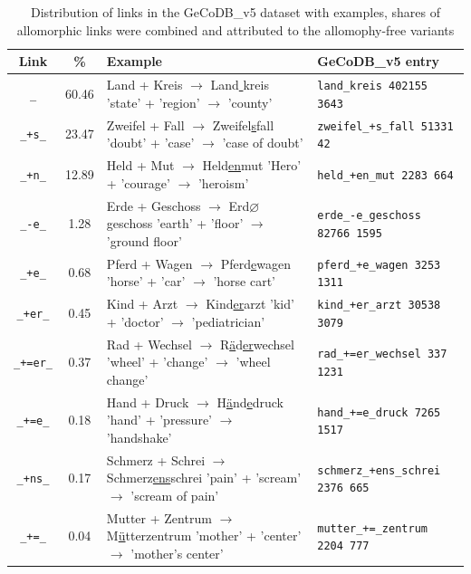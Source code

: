 \documentclass[11pt]{article}
\begin{document}
\begin{table}[h]
\centering
\begin{tabular}{|c|c|l|l|}
\hline
\textbf{Link} & \textbf{\%} & \textbf{Example} & \textbf{GeCoDB\_v5 entry} \\ \hline
\texttt{\_} & 60.46 & \makecell{Land + Kreis $\rightarrow$ Land\underline{ }kreis \\ 'state' + 'region' $\rightarrow$ 'county'} & \texttt{land\_kreis	402155	3643} \\ \hline
\texttt{\_+s\_} & 23.47 & \makecell{Zweifel + Fall $\rightarrow$ Zweifel\underline{s}fall \\ 'doubt' + 'case' $\rightarrow$ 'case of doubt'} & \texttt{zweifel\_+s\_fall	51331	42} \\ \hline
\texttt{\_+n\_} & 12.89 & \makecell{Held + Mut $\rightarrow$ Held\underline{en}mut \\ 'Hero' + 'courage' $\rightarrow$ 'heroism'} & \texttt{held\_+en\_mut	2283	664} \\ \hline
\texttt{\_-e\_} & 1.28 & \makecell{Erde + Geschoss $\rightarrow$ Erd\underline{$\varnothing$}geschoss \\ 'earth' + 'floor' $\rightarrow$ {'ground floor'}} & \texttt{erde\_-e\_geschoss	82766	1595} \\ \hline
\texttt{\_+e\_} & 0.68 & \makecell{Pferd + Wagen $\rightarrow$ Pferd\underline{e}wagen \\ 'horse' + 'car' $\rightarrow$ 'horse cart'} & \texttt{pferd\_+e\_wagen	3253	1311} \\ \hline
\texttt{\_+er\_} & 0.45 & \makecell{Kind + Arzt $\rightarrow$ Kind\underline{er}arzt \\ 'kid' + 'doctor' $\rightarrow$ 'pediatrician'} & \texttt {kind\_+er\_arzt	30538	3079} \\ \hline
\texttt{\_+=er\_} & 0.37 & \makecell{Rad + Wechsel $\rightarrow$ R\underline{{\"a}}d\underline{er}wechsel \\ 'wheel' + 'change' $\rightarrow$ 'wheel change'} & \texttt {rad\_+=er\_wechsel	337	1231} \\ \hline
\texttt{\_+=e\_} & 0.18 & \makecell{Hand + Druck $\rightarrow$ H\underline{{\"a}}nd\underline{e}druck \\ 'hand' + 'pressure' $\rightarrow$ 'handshake'} & \texttt {hand\_+=e\_druck	7265	1517} \\ \hline
\texttt{\_+ns\_} & 0.17 & \makecell{Schmerz + Schrei $\rightarrow$ Schmerz\underline{ens}schrei \\ 'pain' + 'scream' $\rightarrow$ 'scream of pain'} & \texttt {schmerz\_+ens\_schrei	2376	665} \\ \hline
\texttt{\_+=\_} & 0.04 & \makecell{Mutter + Zentrum $\rightarrow$ M\underline{{\"u}}tterzentrum \\ 'mother' + 'center' $\rightarrow$ 'mother's center'} & \texttt {mutter\_+=\_zentrum	2204	777} \\ \hline
\end{tabular}
\caption{Distribution of links in the GeCoDB\_v5 dataset with examples, shares of allomorphic links were combined and attributed to the allomophy-free variants}
\label{tab:link_dirst}
\end{table}
\end{document}
